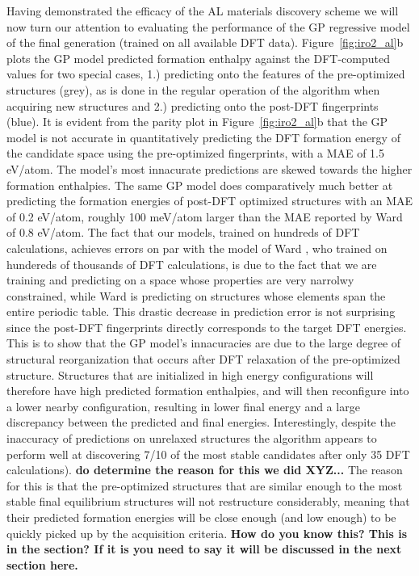Having demonstrated the efficacy of the AL materials discovery scheme we will now turn our attention to evaluating the performance of the GP regressive model of the final generation (trained on all available \IrOthree DFT data).
%
Figure~\ref{fig:iro2_al}b plots the GP model predicted formation enthalpy against the DFT-computed values for two special cases,
1.) predicting onto the features of the pre-optimized structures (grey), as is done in the regular operation of the algorithm when acquiring new structures and
2.) predicting onto the post-DFT fingerprints (blue).
%
It is evident from the parity plot in Figure~\ref{fig:iro2_al}b that the GP model is not accurate in quantitatively predicting the DFT formation energy of the candidate space using the pre-optimized fingerprints,
with a MAE of \mytilde\num{1.5} eV/atom.
%
The model's most innacurate predictions are skewed towards the higher formation enthalpies.
%
The same GP model does comparatively much better at predicting the formation energies of post-DFT optimized structures with an MAE of \mytilde\num{0.2} eV/atom,
roughly 100 meV/atom larger than the MAE reported by Ward  of 0.8 eV/atom.
%
The fact that our models, trained on hundreds of DFT calculations,  achieves errors on par with the model of Ward , who trained on hundereds of thousands of DFT calculations, is due to the fact that we are training and predicting on a space whose properties are very narrolwy constrained, while Ward  is predicting on structures whose elements span the entire periodic table.
%
This drastic decrease in prediction error is not surprising since the post-DFT fingerprints directly corresponds to the target DFT energies.
%
This is to show that the GP model's innacuracies are due to the large degree of structural reorganization that occurs after DFT relaxation of the pre-optimized structure.
%
Structures that are initialized in high energy configurations will therefore have high predicted formation enthalpies, and will then reconfigure into a lower nearby configuration, resulting in lower final energy and a large discrepancy between the predicted and final energies.
%
Interestingly, despite the inaccuracy of predictions on unrelaxed structures the algorithm appears to perform well at discovering \num{7/10} of the most stable candidates after only \num{35} DFT calculations). \textbf{do determine the reason for this we did XYZ...}
%
The reason for this is that the pre-optimized structures that are similar enough to the most stable final equilibrium structures will not restructure considerably, meaning that their predicted formation energies will be close enough (and low enough) to be quickly picked up by the acquisition criteria. \textbf{How do you know this?  This is in the section?  If it is you need to say it will be discussed in the next section here.}
%


